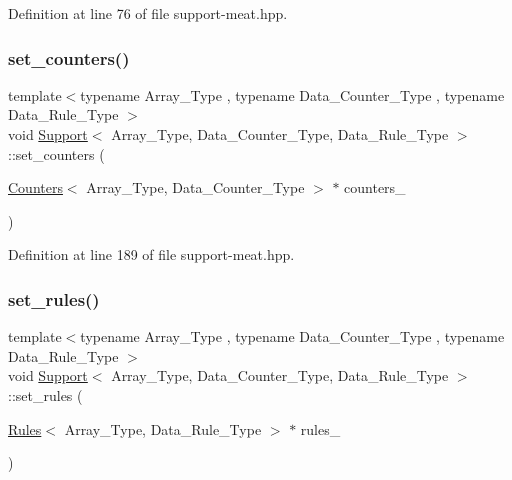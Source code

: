 Definition at line 76 of file support-\/meat.\+hpp.

\mbox{\label{class_support_aef83474cda55c4ed52e313e8ed948b08}} 
\subsubsection{\texorpdfstring{set\+\_\+counters()}{set\_counters()}}
{\footnotesize\ttfamily template$<$typename Array\+\_\+\+Type , typename Data\+\_\+\+Counter\+\_\+\+Type , typename Data\+\_\+\+Rule\+\_\+\+Type $>$ \\
void \hyperlink{class_support}{Support}$<$ Array\+\_\+\+Type, Data\+\_\+\+Counter\+\_\+\+Type, Data\+\_\+\+Rule\+\_\+\+Type $>$\+::set\+\_\+counters (\begin{DoxyParamCaption}\item[{\hyperlink{class_counters}{Counters}$<$ Array\+\_\+\+Type, Data\+\_\+\+Counter\+\_\+\+Type $>$ $\ast$}]{counters\+\_\+ }\end{DoxyParamCaption})\hspace{0.3cm}{\ttfamily [inline]}}



Definition at line 189 of file support-\/meat.\+hpp.

\mbox{\label{class_support_a66dc1a0e7097d547ea9c84df777ad477}} 
\subsubsection{\texorpdfstring{set\+\_\+rules()}{set\_rules()}}
{\footnotesize\ttfamily template$<$typename Array\+\_\+\+Type , typename Data\+\_\+\+Counter\+\_\+\+Type , typename Data\+\_\+\+Rule\+\_\+\+Type $>$ \\
void \hyperlink{class_support}{Support}$<$ Array\+\_\+\+Type, Data\+\_\+\+Counter\+\_\+\+Type, Data\+\_\+\+Rule\+\_\+\+Type $>$\+::set\+\_\+rules (\begin{DoxyParamCaption}\item[{\hyperlink{class_rules}{Rules}$<$ Array\+\_\+\+Type, Data\+\_\+\+Rule\+\_\+\+Type $>$ $\ast$}]{rules\+\_\+ }\end{DoxyParamCaption})\hspace{0.3cm}{\ttfamily [inline]}}



